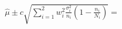 \documentclass[12pt]{article}
\begin{document}
  
\begin{align*}
    & \hat \mu \pm c \sqrt{\sum_{i = 1}^{2} w_i^2  \frac {\sigma_i^2} {n_i}(1 - \frac {n_i} {N_i})} 
    = & 
\end{align*}
\end{document}
